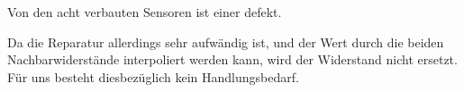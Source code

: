 \noindent
Von den acht verbauten Sensoren ist einer defekt. 
\newline

\noindent
Da die Reparatur allerdings sehr aufwändig ist, und der Wert durch die beiden Nachbarwiderstände interpoliert werden kann, wird der Widerstand nicht ersetzt. Für uns besteht diesbezüglich kein Handlungsbedarf.












